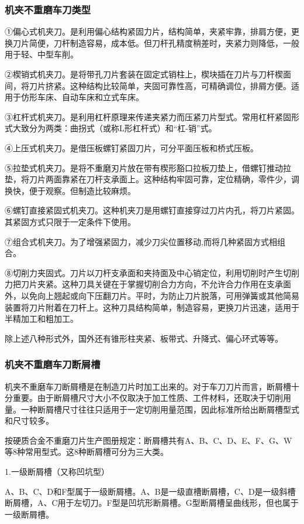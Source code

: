 \documentclass{ctexbook}
\begin{document}
\subsubsection{机夹不重磨车刀类型}
①偏心式机夹刀。是利用偏心结构紧固力片，结构简单，夹紧牢靠，排肩方便，更换刀片简便，刀杆制造容易，成本低。但刀杆孔精度稍差时，夹紧力则降低，一般用于轻、中型车削。

②楔销式机夹刀。是将带孔刀片套装在固定式销柱上，楔块插在刀片与刀杆楔面间，将刀片挤紧。这种结构比较简单，夹固可靠性高，可精确调位，排屑方便。适用于仿形车床、自动车床和立式车床。

③杠杆式机夹刀。是利用杠杆原理来传递夹紧力而压紧刀片型式。常用杠杆紧固形式大致分为两类：曲拐式（或称L形杠杆式）和“杠-销”式。

④上压式机夹刀。是借压板螺钉紧固刀片，可分平面压板和桥式压板。

⑤拉垫式机夹刀。是将不重磨刃片放在带有楔形豁口拉板刀垫上，借螺钉推动拉垫，将刀片两面靠紧在刀杆支承面上。这种结构牢固可靠，定位精确，零件少，调换快，便于观察。但制造比较麻烦。

⑥螺钉直接紧固式机夹刀。这种机夹刀是用螺钉直接穿过刀片内孔，将刀片紧固。其紧固方式只限于一定条件下使用。

⑦组合式机夹刀。为了增强紧固力，减少刀尖位置移动,而将几种紧固方式相组合。

⑧切削力夹固式。刀片以刀杆支承面和夹持面及中心销定位，利用切削时产生切削力把刀片夹紧。这种刀具关键在于掌握切削合力方向，不允许合力作用在支承面外，以免向上翘起或向下压翻刀片。平时，为防止刀片脱落，可用弹簧或其他简易装置将刀片附着在刀杆上。这种刀具结构简单，制造容易，更换刀片迅速，适用于半精加工和粗加工。

除上述八种形式外，国外还有锥形柱夹紧、板带式、升降式、偏心环式等等。
\subsubsection{机夹不重磨车刀断屑槽}
机夹不重磨车刀断屑槽是在制造刀片时加工出来的。对于车刀刀片而言，断屑槽十分重要。由于断屑槽尺寸大小不仅取决于加工性质、工件材料，还取决于切削用量。一种断屑槽尺寸往往只适用于一定切削用量范围，因此标准所给出断屑槽型式和尺寸较多。

按硬质合金不重磨刀片生产图册规定：断屑槽共有A、B、C、D、E、F、G、W等8种常用型式。这8种断屑槽可分为三大类。

1.一级断屑槽（又称凹坑型）

A、B、C、D和F型属于一级断屑槽。A、B是一级直槽断屑槽，C、D是一级斜槽断屑槽，A、C用于左切刀。F型是凹坑形断屑槽。G型断屑槽呈曲线形，但也属于一级断屑槽。
\end{document}

